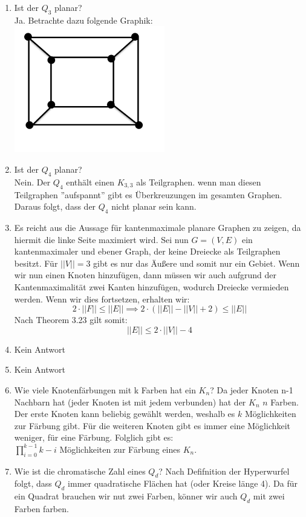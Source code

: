 \begin{enumerate}[label=(\alph*)]
        \item Ist der $Q_3$ planar? \\
        Ja. Betrachte dazu folgende Graphik:\\
        \includegraphics[width=0.3\linewidth]{Q3}
        
        \item Ist der $Q_4$ planar?\\
        Nein. Der $Q_4$ enthält einen $K_{3,3}$ als Teilgraphen. wenn man diesen Teilgraphen ''aufspannt'' 
        gibt es Überkreuzungen im gesamten Graphen. Daraus folgt, dass der $Q_4$ nicht planar sein kann.
        
        \item Es reicht aus die Aussage für kantenmaximale planare Graphen zu zeigen, da hiermit die 
        linke Seite maximiert wird. Sei nun $G=(V,E)$ ein kantenmaximaler und ebener Graph, der keine 
        Dreiecke als Teilgraphen besitzt. Für $||V||=3$ gibt es nur das Äußere und somit nur ein Gebiet. 
        Wenn wir nun einen Knoten hinzufügen, dann müssen wir auch aufgrund der Kantenmaximalität zwei 
        Kanten hinzufügen, wodurch Dreiecke vermieden werden.  Wenn wir dies fortsetzen, erhalten wir:
        $$ 2 \cdot ||F|| \le ||E||\implies 2 \cdot \left(||E|| - ||V|| + 2 \right) \le ||E||$$
        Nach Theorem 3.23 gilt somit:
        $$||E|| \le 2 \cdot ||V|| - 4 $$ 
        
        \item Kein Antwort
        
        \item Kein Antwort

        \item Wie viele Knotenfärbungen mit k Farben hat ein $K_n$?
        Da jeder Knoten n-1 Nachbarn hat (jeder Knoten ist mit jedem verbunden) hat der $K_n$ $n$ Farben. 
        Der erste Knoten kann beliebig gewählt werden, weshalb es $k$ Möglichkeiten zur Färbung gibt. 
        Für die weiteren Knoten gibt es immer eine Möglichkeit weniger, für eine Färbung. Folglich gibt es: \\
        $\prod_{i=0}^{k-1} k - i$ Möglichkeiten zur Färbung eines $K_n$.
          
        \item Wie ist die chromatische Zahl eines $Q_d$?
        Nach Defifnition der Hyperwurfel folgt, dass $Q_d$ immer quadratische Flächen hat (oder Kreise 
        länge 4). Da für ein Quadrat brauchen wir nut zwei Farben, könner wir auch $Q_d$ mit zwei Farben farben.
        
    \end{enumerate}
